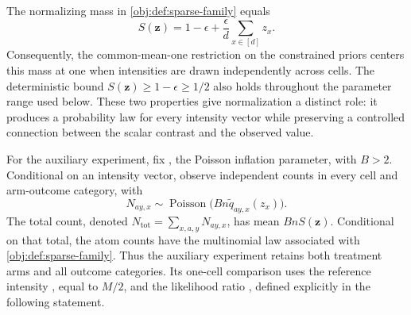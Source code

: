 The normalizing mass  in \cref{obj:def:sparse-family} equals
\[
S(\mathbf z)=1-\epsilon+\frac{\epsilon}{d}\sum_{x\in[d]}z_x.
\]
Consequently, the common-mean-one restriction on the constrained priors centers this mass at one when intensities are drawn independently across cells. The deterministic bound \(S(\mathbf z)\ge 1-\epsilon\ge 1/2\) also holds throughout the parameter range used below. These two properties give normalization a distinct role: it produces a probability law for every intensity vector while preserving a controlled connection between the scalar contrast and the observed value.

For the auxiliary experiment, fix , the Poisson inflation parameter, with \(B>2\). Conditional on an intensity vector, observe independent counts in every cell and arm-outcome category, with
\[
N_{ay,x}\sim\operatorname{Poisson}
\bigl(Bn\widetilde q_{ay,x}(z_x)\bigr).
\]
The total count, denoted \(N_{\mathrm{tot}}=\sum_{x,a,y}N_{ay,x}\), has mean \(BnS(\mathbf z)\). Conditional on that total, the atom counts have the multinomial law associated with \cref{obj:def:sparse-family}. Thus the auxiliary experiment retains both treatment arms and all outcome categories. Its one-cell comparison uses the reference intensity , equal to \(M/2\), and the likelihood ratio , defined explicitly in the following statement.

